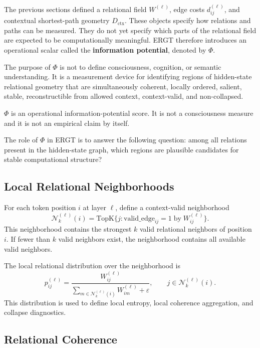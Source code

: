 \documentclass[11pt]{article}
\begin{document}
The previous sections defined a relational field $W^{(\ell)}$, edge costs $d_{ij}^{(\ell)}$, and contextual shortest-path geometry $D_{\mathrm{ctx}}$. These objects specify how relations and paths can be measured. They do not yet specify which parts of the relational field are expected to be computationally meaningful. ERGT therefore introduces an operational scalar called the \textbf{information potential}, denoted by $\Phi$.

The purpose of $\Phi$ is not to define consciousness, cognition, or semantic understanding. It is a measurement device for identifying regions of hidden-state relational geometry that are simultaneously coherent, locally ordered, salient, stable, reconstructible from allowed context, context-valid, and non-collapsed.

\begin{ergtclaim}
$\Phi$ is an operational information-potential score. It is not a consciousness measure and it is not an empirical claim by itself.
\end{ergtclaim}

The role of $\Phi$ in ERGT is to answer the following question: among all relations present in the hidden-state graph, which regions are plausible candidates for stable computational structure?

\subsection{Local Relational Neighborhoods}

For each token position $i$ at layer $\ell$, define a context-valid neighborhood
\[
\mathcal{N}_k^{(\ell)}(i)
=
\mathrm{TopK}\{j:\mathrm{valid\_edge}_{ij}=1\;\mathrm{by}\;W_{ij}^{(\ell)}\}.
\]
This neighborhood contains the strongest $k$ valid relational neighbors of position $i$. If fewer than $k$ valid neighbors exist, the neighborhood contains all available valid neighbors.

The local relational distribution over the neighborhood is
\[
p_{ij}^{(\ell)}
=
\frac{W_{ij}^{(\ell)}}{\sum_{m\in\mathcal{N}_k^{(\ell)}(i)}W_{im}^{(\ell)}+\varepsilon},
\qquad
j\in\mathcal{N}_k^{(\ell)}(i).
\]
This distribution is used to define local entropy, local coherence aggregation, and collapse diagnostics.

\subsection{Relational Coherence}
\end{document}
